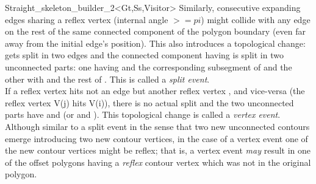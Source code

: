 \begin{ccRefClass}{Straight_skeleton_builder_2<Gt,Ss,Visitor>}
Similarly, consecutive expanding edges  sharing a reflex vertex (internal angle $>=pi$) might collide with any edge  on the rest of the same connected component of the polygon boundary (even far away from the initial edge's position). This also introduces a topological change:  gets split in two edges and the connected component having  is split in two unconnected parts: one having  and the corresponding subsegment of  and the other with  and the rest of . This is called a {\em split event}.\\ If a reflex vertex hits not an edge  but another reflex vertex , and vice-versa (the reflex vertex V(j) hits V(i)), there is no actual split and the two unconnected parts have  and  (or  and ). This topological change is called a {\em vertex event}. Although similar to a split event in the sense that two new unconnected contours emerge introducing two new contour vertices, in the case of a vertex event one of the new contour vertices might be reflex; that is, a vertex event \textit{may} result in one of the offset polygons having a \textit{reflex} contour vertex which was not in the original polygon.


\end{ccRefClass}
